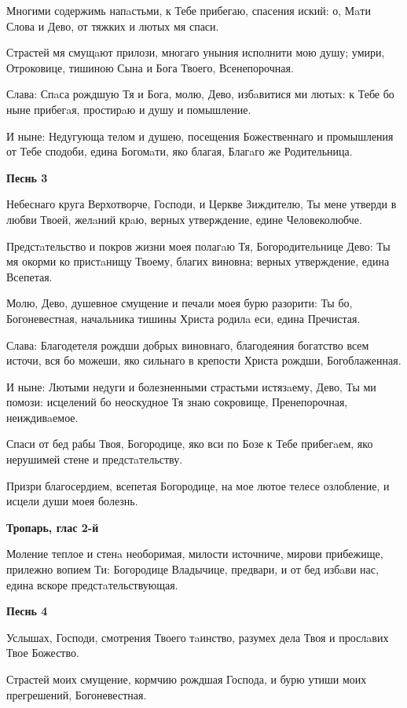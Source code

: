 Многими содержимь напaстьми, к Тебе прибегаю, спасения иский: о, Мaти Слова и Дево, от тяжких и лютых мя спаси.


Страстей мя смущaют прилози, многаго уныния исполнити мою душу; умири, Отроковице, тишиною Сына и Бога Твоего, Всенепорочная.


Слава: Спaса рождшую Тя и Бога, молю, Дево, избaвитися ми лютых: к Тебе бо ныне прибегaя, простирaю и душу и помышление.


И ныне: Недугующа телом и душею, посещения Божественнаго и промышления от Тебе сподоби, едина Богомaти, яко благая, Благaго же Родительница.


\medskip
\bfseries Песнь 3\normalfont{}


Небеснаго круга Верхотворче, Господи, и Церкве Зиждителю, Ты мене утверди в любви Твоей, желaний крaю, верных утверждение, едине Человеколюбче.

Предстaтельство и покров жизни моея полагaю Тя, Богородительнице Дево: Ты мя окорми ко пристaнищу Твоему, благих виновна; верных утверждение, едина Всепетая.


Молю, Дево, душевное смущение и печали моея бурю разорити: Ты бо, Богоневестная, начальника тишины Христа родилa еси, едина Пречистая.


Слава: Благодетеля рождши добрых виновнаго, благодеяния богатство всем источи, вся бо можеши, яко сильнаго в крепости Христа рождши, Богоблаженная.


И ныне: Лютыми недуги и болезненными страстьми истязaему, Дево, Ты ми помози: исцелений бо неоскудное Тя знаю сокровище, Пренепорочная, неиждивaемое.


Спаси от бед рабы Твоя, Богородице, яко вси по Бозе к Тебе прибегaем, яко нерушимей стене и предстaтельству.


Призри благосердием, всепетая Богородице, на мое лютое телесе озлобление, и исцели души моея болезнь.


\medskip
\bfseries Тропарь, глас 2-й\normalfont{}


Моление теплое и стенa необоримая, милости источниче, мирови прибежище, прилежно вопием Ти: Богородице Владычице, предвари, и от бед избaви нас, едина вскоре предстaтельствующая.


\medskip
\bfseries Песнь 4\normalfont{}


Услышах, Господи, смотрения Твоего тaинство, разумех дела Твоя и прослaвих Твое Божество.

Страстей моих смущение, кормчию рождшая Господа, и бурю утиши моих прегрешений, Богоневестная.


